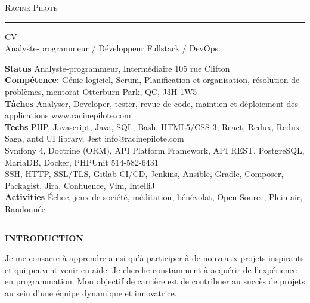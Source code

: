 \documentclass[10pt,A4]{article}
\newcommand{\cvsection}[1]
{
	\begin{center}
		\large\textcolor{sectcol}{\textbf{#1}}
	\end{center}
}
\newcommand{\metasection}[2]
{
\footnotesize{#2} \hspace*{\fill} \footnotesize{#1}\\[1pt]
}
\begin{document}
\pagestyle{fancy}


\vspace{-8pt}
\begin{center}
	\HUGE \textsc{Racine Pilote} \textcolor{sectcol}{\rule[-1mm]{1mm}{0.9cm}} \textsc{CV}\\[2pt]
	\small Analyste-programmeur / Développeur Fullstack / DevOps.
\end{center}

\vspace{6pt}


\metasection{105 rue Clifton}{\textbf{Status} Analyste-programmeur, Intermédiaire}
\metasection{Otterburn Park, QC, J3H 1W5}{\textbf{Compétence:} Génie logiciel, Scrum, Planification et organisation, résolution de problèmes, mentorat}
\metasection{www.racinepilote.com}{\textbf{Tâches} Analyser, Developer, tester, revue de code, maintien et déploiement des applications}
\metasection{info@racinepilote.com}{\textbf{Techs} PHP, Javascript, Java, SQL, Bash, HTML5/CSS 3, React, Redux, Redux Saga, antd UI library, Jest}
\metasection{514-582-6431}{Symfony 4, Doctrine (ORM), API Platform Framework, API REST, PostgreSQL, MariaDB, Docker, PHPUnit}
\metasection{}{SSH, HTTP, SSL/TLS, Gitlab CI/CD, Jenkins, Ansible, Gradle, Composer, Packagist, Jira, Confluence, Vim, IntelliJ}
\metasection{}{\textbf{Activities} Échec, jeux de société, méditation, bénévolat, Open Source, Plein air, Randonnée}
\vspace{-2pt}
\textcolor{softcol}{\hrule}
\vspace{6pt}

\normalsize

\vspace{-6pt}

\cvsection{INTRODUCTION}
Je me consacre à apprendre ainsi qu’à participer à de nouveaux projets inspirants et qui peuvent venir en aide.
Je cherche constamment à acquérir de l’expérience en programmation.
Mon objectif de carrière est de contribuer au succès de projets au sein d’une équipe dynamique et innovatrice.
\end{document}
